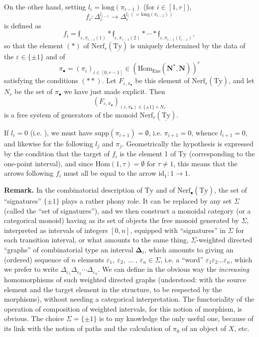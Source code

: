 \documentclass[11pt]{article}
\newcommand{\printedpage}[1]{\marginpar{\footnotesize p.~#1}}
\newcommand{\msp}[1]{\marginpar{\footnotesize [#1]}}
\newcommand{\Ty}{\underline{\mathrm{Ty}}}
\newcommand{\Nerf}{\mathrm{Nerf}}
\begin{document}
\printedpage{39}
On the other hand, setting $l_i = \mathrm{long}(\pi_{i-1})$ (for $i \in [1,r]$),
\[
f_i : \Delta_\varepsilon^{l_{i-1}} \longrightarrow \Delta_\varepsilon^{l_i\ (=\mathrm{long}(\pi_{i-1}))}
\]
is defined as
\[
f_i = \mathfrak{f}_{\varepsilon,\pi_{i-1}(1)} * \mathfrak{f}_{\varepsilon,\pi_{i-1}(2)} * \cdots * \mathfrak{f}_{\varepsilon,\pi_{i-1}(l_{i-1})},
\]
so that the element $(*)$ of $\Nerf_r(\Ty)$ is uniquely determined by the data of the $\varepsilon \in \{\pm 1\}$ and of
\[
\pi_\bullet = (\pi_i)_{i\in[0,r-1]} \in (\mathrm{Hom}_{\mathrm{Ens}}(\mathbf{N}^*,\mathbf{N}))^r
\]
satisfying the conditions $(**)$. Let $F_{\varepsilon,\pi_\bullet}$ be this element of $\Nerf_r(\Ty)$, and let $N_r$ be the set of $\pi_\bullet$ we have just made explicit. Then
\[
(F_{\varepsilon,\pi_\bullet})_{(\varepsilon,\pi_\bullet)\in\{\pm1\}\times N_r}
\]
is a free system of generators of the monoid $\Nerf_r(\Ty)$.

If $l_i = 0$ (i.e. ), we must have $\mathrm{supp}(\pi_{i+1}) = \emptyset$, i.e. $\pi_{i+1} = 0$, whence $l_{i+1} = 0$, and likewise for the following $l_j$ and $\pi_j$. Geometrically the hypothesis is expressed by the condition that the target
\msp{page 58}
of $f_i$ is the element 1 of Ty (corresponding to the one-point interval), and since $\mathrm{Hom}(1,\tau) = \emptyset$ for $\tau \neq 1$, this means that the arrows following $f_i$ must all be equal to the arrow $\mathrm{id}_1 : 1 \longrightarrow 1$.

\textbf{Remark.} In the combinatorial description of $\Ty$ and of $\Nerf_\bullet(\Ty)$, the set of ``signatures'' $\{\pm1\}$ plays a rather phony role. It can be replaced by any set $\Sigma$ (called the ``set of signatures''), and we then construct a monoidal category (or a categorical monoid) having as its set of objects the free monoid generated by $\Sigma$, interpreted as intervals of integers $[0,n]$, equipped with ``signatures'' in $\Sigma$ for each transition interval, or what amounts to the same thing, $\Sigma$-weighted directed ``graphs'' of combinatorial type an interval $\boldsymbol{\Delta}_i$, which amounts to giving an (ordered) sequence of $n$ elements $\varepsilon_1,\ \varepsilon_2,\ \ldots\ ,\ \varepsilon_n \in \Sigma$, i.e. a ``word'' $\varepsilon_1\varepsilon_2\ldots\varepsilon_n$, which we prefer to write $\Delta_{\varepsilon_1}\Delta_{\varepsilon_2}\cdots\Delta_{\varepsilon_n}$. We can define in the obvious way the \textit{increasing} homomorphisms of such weighted directed graphs (understood: with the source element and the target element in the structure, to be respected by the morphisms), without needing a categorical interpretation. The functoriality of the operation of composition of weighted intervals, for this notion of morphism, is obvious. The
\msp{page 59}
choice $\Sigma = \{\pm1\}$ is to my knowledge the only useful one, because of its link with the notion of paths and the calculation of $\pi_0$ of an object of $X$, etc.
\end{document}
